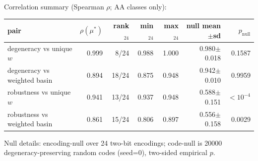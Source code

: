 \noindent Correlation summary (Spearman $\rho$; AA classes only):
\begin{center}
\scriptsize
\setlength{\tabcolsep}{5pt}
\renewcommand{\arraystretch}{1.10}
\begin{tabular}{l r r r r r r}
\toprule
pair & $\rho(\mu^\ast)$ & rank$_{24}$ & min$_{24}$ & max$_{24}$ & null mean$\pm$sd & $p_{\mathrm{null}}$ \\
\midrule
degeneracy vs unique $w$ & 0.999 & 8/24 & 0.988 & 1.000 & 0.980$\pm$0.018 & 0.1587 \\
degeneracy vs weighted basin & 0.894 & 18/24 & 0.875 & 0.948 & 0.942$\pm$0.010 & 0.9959 \\
robustness vs unique $w$ & 0.941 & 13/24 & 0.937 & 0.948 & 0.588$\pm$0.151 & $<10^{-4}$ \\
robustness vs weighted basin & 0.861 & 15/24 & 0.806 & 0.897 & 0.556$\pm$0.158 & 0.0029 \\
\bottomrule
\end{tabular}
\end{center}
\noindent Null details: encoding-null over 24 two-bit encodings; code-null is 20000 degeneracy-preserving random codes (seed=0), two-sided empirical $p$.

